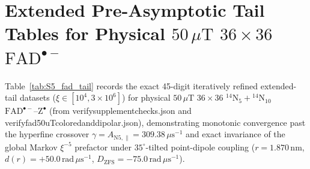 \documentclass[onecolumn,10pt,notitlepage,amsmath,amssymb,floatfix]{revtex4-2}
\theoremstyle{plain}
\theoremstyle{definition}
\newcommand{\leanid}[1]{{\footnotesize\ttfamily\def\_{\textunderscore\allowbreak}#1}}
\begin{document}
\section{Extended Pre-Asymptotic Tail Tables for Physical \texorpdfstring{$50\,\mu\text{T}$ $36\times 36$ $\mathrm{FAD}^{\bullet-}$}{50 uT 36x36 FAD.-}}
\label{sec:S5}

Table~\ref{tab:S5_fad_tail} records the exact 45-digit iteratively refined extended-tail datasets ($\xi \in [10^4, 3\times 10^6]$) for physical $50\,\mu\text{T}$ $36\times 36$ $^{14}\text{N}_5 + {}^{14}\text{N}_{10}$ $\mathrm{FAD}^{\bullet-}\text{--}\mathrm{Z}^{\bullet}$ (from \leanid{verify\_05\_supplement\_checks.json} and \leanid{verify\_06\_fad50uT\_colored\_and\_dipolar.json}), demonstrating monotonic convergence past the hyperfine crossover $\gamma = A_{\mathrm{N5},\parallel} = 309.38\,\mu\text{s}^{-1}$ and exact invariance of the global Markov $\xi^{-5}$ prefactor under $35^\circ$-tilted point-dipole coupling ($r = 1.870\,\text{nm}$, $d(r) = +50.0\,\text{rad}\,\mu\text{s}^{-1}$, $D_{\mathrm{ZFS}} = -75.0\,\text{rad}\,\mu\text{s}^{-1}$).
\end{document}
